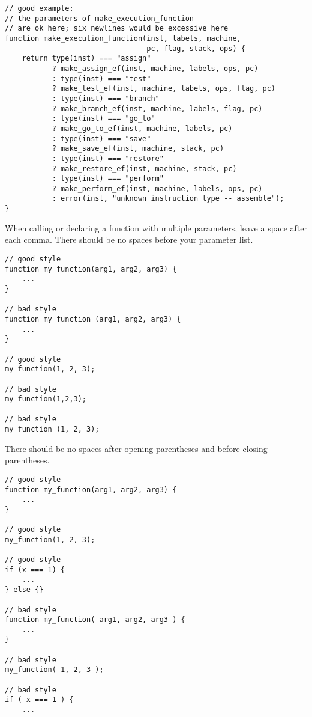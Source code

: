 \begin{lstlisting}
// good example:
// the parameters of make_execution_function 
// are ok here; six newlines would be excessive here
function make_execution_function(inst, labels, machine, 
                                 pc, flag, stack, ops) {
    return type(inst) === "assign"
           ? make_assign_ef(inst, machine, labels, ops, pc)
           : type(inst) === "test"
           ? make_test_ef(inst, machine, labels, ops, flag, pc)
           : type(inst) === "branch"
           ? make_branch_ef(inst, machine, labels, flag, pc)
           : type(inst) === "go_to"
           ? make_go_to_ef(inst, machine, labels, pc)
           : type(inst) === "save"
           ? make_save_ef(inst, machine, stack, pc)
           : type(inst) === "restore"
           ? make_restore_ef(inst, machine, stack, pc)
           : type(inst) === "perform"
           ? make_perform_ef(inst, machine, labels, ops, pc)
           : error(inst, "unknown instruction type -- assemble");
}
\end{lstlisting}

When calling or declaring a function with multiple parameters, leave a space after each comma.
There should be no spaces before your parameter list.

\begin{lstlisting}
// good style
function my_function(arg1, arg2, arg3) {
    ...
}

// bad style
function my_function (arg1, arg2, arg3) {
    ...
}

// good style
my_function(1, 2, 3);

// bad style
my_function(1,2,3);

// bad style
my_function (1, 2, 3);
\end{lstlisting}

There should be no spaces after opening parentheses and before closing parentheses.
  
\begin{lstlisting}
// good style
function my_function(arg1, arg2, arg3) {
    ...
}

// good style
my_function(1, 2, 3);

// good style
if (x === 1) {
    ...
} else {}

// bad style
function my_function( arg1, arg2, arg3 ) {
    ...
}

// bad style
my_function( 1, 2, 3 );

// bad style
if ( x === 1 ) {
    ...
\end{lstlisting}

